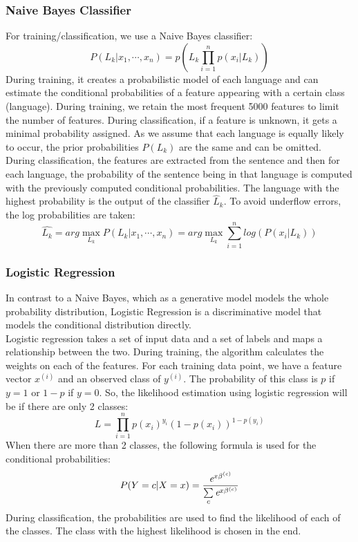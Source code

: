 \documentclass[11pt]{article}
\begin{document}
\subsubsection{Naive Bayes Classifier}
For training/classification, we use a Naive Bayes classifier:
$$P(L_k\vert x_1,\cdots,x_n)=p(L_k\prod\limits_{i=1}^np(x_i\vert L_k))$$
During training, it creates a probabilistic model of each
language and can estimate the conditional probabilities of
a feature appearing with a certain class (language). During
training, we retain the most frequent 5000 features to limit
the number of features. During classification, if a feature is
unknown, it gets a minimal probability assigned. As we assume
that each language is equally likely to occur, the prior
probabilities $P(L_k)$ are the same and can be omitted.
During classification, the features are extracted from the
sentence and then for each language, the probability of the
sentence being in that language is computed with the previously computed conditional probabilities. The language
with the highest probability is the output of the classifier $\hat{L}_k$. To avoid underflow errors, the log probabilities are taken:
$$\hat{L_k}=arg\max\limits_{L_k}P(L_k\vert x_1,\cdots,x_n)=arg\max\limits_{L_k}\sum\limits_{i=1}^n log(P(x_i\vert L_k))$$
\subsubsection{Logistic Regression}
In contrast to a Naive Bayes, which as a generative model
models the whole probability distribution, Logistic Regression
is a discriminative model that models the conditional
distribution directly.\\
Logistic regression takes a set of input data and a set of
labels and maps a relationship between the two. During
training, the algorithm calculates the weights on each of the
features. For each training data point, we have a feature vector
$x^{(i)}$ and an observed class of $y^{(i)}$. The probability of this class is $p$ if $y = 1$ or $1-p$ if $y = 0$. So, the likelihood estimation using logistic regression will be if there are only 2 classes:
$$L=\prod\limits_{i=1}^n p(x_i)^{y_i}(1-p(x_i))^{1-p(y_i)}$$
When there are more than 2 classes, the following formula
is used for the conditional probabilities:
$$P(Y=c\vert X=x)=\frac{\emph{e}^{x\beta^{(c)}}}{\sum\limits_c \emph{e}^{x\beta^{(c)}}}$$
During classification, the probabilities are used to find the
likelihood of each of the classes. The class with the highest
likelihood is chosen in the end.
\end{document}
